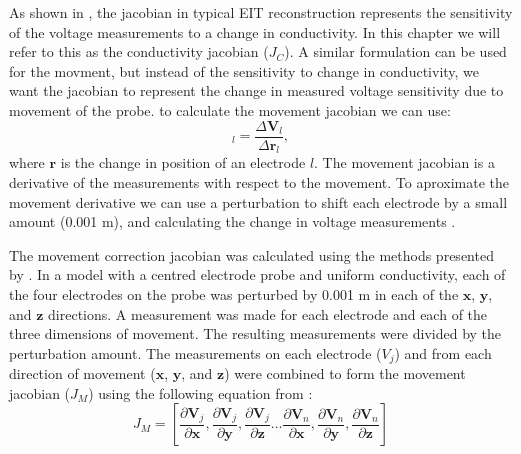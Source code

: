 As shown in , the jacobian in typical EIT reconstruction 
represents the sensitivity of the voltage measurements to a change in conductivity. 
In this chapter we will refer to this as the conductivity jacobian ($J_C$). 
A similar formulation can be used for the movment, but instead of the sensitivity 
to change in conductivity, we want the jacobian to represent the 
change in measured voltage 
sensitivity due to movement of the probe. to calculate the movement jacobian we can use:
\begin{equation}
	[J_M]_l = \frac{\Delta\mathbf{V}_l}{\Delta\mathbf{r}_l},
\end{equation}
where $\mathbf{r}$ is the change in position of an electrode $l$.
The movement jacobian is a derivative of the measurements with respect to the movement.
To aproximate the movement derivative we can use a perturbation to 
shift each electrode by a small amount (0.001 m), and calculating the 
change in voltage measurements \parencite{gomez-laberge_direct_2008}.

The movement correction jacobian was calculated using the methods presented by
. In a model with a centred electrode
probe and uniform conductivity, each of the four electrodes on the probe was
perturbed by 0.001 m in each of the $\mathbf x$, $\mathbf y$, 
and $\mathbf z$ directions. A measurement was made for 
each electrode and each of the three dimensions of movement. 
The resulting measurements were divided by the perturbation 
amount. 
The measurements on each electrode ($V_j$) and from each  direction 
of movement ($\mathbf x$, $\mathbf y$, 
and $\mathbf z$) were combined to form the movement 
jacobian ($J_M$) using the following equation from
:
\begin{equation}
	J_M = \left[ 
		  \frac{\partial\mathbf{V}_j}{\partial\mathbf{x}},
		  \frac{\partial\mathbf{V}_j}{\partial\mathbf{y}},
	      \frac{\partial\mathbf{V}_j}{\partial\mathbf{z}} ... 
		  \frac{\partial\mathbf{V}_n}{\partial\mathbf{x}},
		  \frac{\partial\mathbf{V}_n}{\partial\mathbf{y}},
	      \frac{\partial\mathbf{V}_n}{\partial\mathbf{z}} 
		  \right]
\end{equation}

